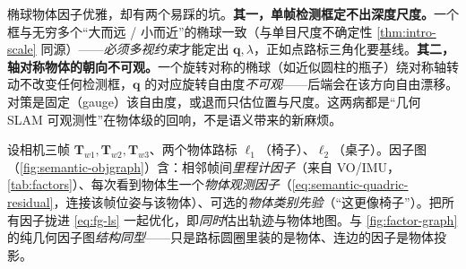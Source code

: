 \begin{pitfall}
椭球物体因子优雅，却有两个易踩的坑。\textbf{其一，单帧检测框定不出深度尺度。}一个框与无穷多个“大而远 / 小而近”的椭球一致（与单目尺度不确定性 \cref{thm:intro-scale} 同源）——\emph{必须多视约束}才能定出 $\mathbf{q},\lambda$，正如点路标三角化要基线。\textbf{其二，轴对称物体的朝向不可观。}一个旋转对称的椭球（如近似圆柱的瓶子）绕对称轴转动不改变任何检测框，$\mathbf{q}$ 的对应旋转自由度\emph{不可观}——后端会在该方向自由漂移。对策是固定（gauge）该自由度，或退而只估位置与尺度。这两病都是“几何 SLAM 可观测性”在物体级的回响，不是语义带来的新麻烦。
\end{pitfall}

\begin{example}\label{ex:semantic-objgraph}
设相机三帧 $\mathbf{T}_{w1},\mathbf{T}_{w2},\mathbf{T}_{w3}$、两个物体路标 $\boldsymbol\ell_1$（椅子）、$\boldsymbol\ell_2$（桌子）。因子图（\cref{fig:semantic-objgraph}）含：相邻帧间\emph{里程计因子}（来自 VO/IMU，\cref{tab:factors}）、每次看到物体生一个\emph{物体观测因子}（\cref{eq:semantic-quadric-residual}，连接该帧位姿与该物体）、可选的\emph{物体类别先验}（“这更像椅子”）。把所有因子拢进 \cref{eq:fg-ls} 一起优化，即\emph{同时}估出轨迹与物体地图。与 \cref{fig:factor-graph} 的纯几何因子图\emph{结构同型}——只是路标圆圈里装的是物体、连边的因子是物体投影。
\end{example}


